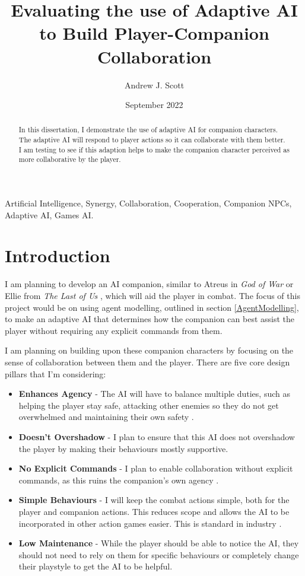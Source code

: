 \documentclass{IEEEtran}
\title{Evaluating the use of Adaptive AI to Build Player-Companion Collaboration}
\author{Andrew J. Scott}
\date{September 2022}
\begin{document}
	\maketitle

\begin{abstract}
In this dissertation, I demonstrate the use of adaptive AI for companion characters. The adaptive AI will respond to player actions so it can collaborate with them better. I am testing to see if this adaption helps to make the companion character perceived as more collaborative by the player.
\end{abstract}

 \begin{IEEEkeywords}
Artificial Intelligence, Synergy, Collaboration, Cooperation, Companion NPCs, Adaptive AI, Games AI.
\end{IEEEkeywords}

\section{Introduction}
\label{Intro}

I am planning to develop an AI companion, similar to Atreus in \textit{God of War} \cite{GDCAtreus} or Ellie from \textit{The Last of Us} \cite{GAIP2EllieAI}, which will aid the player in combat. The focus of this project would be on using agent modelling, outlined in section \ref{AgentModelling}, to make an adaptive AI that determines how the companion can best assist the player without requiring any explicit commands from them.

I am planning on building upon these companion characters by focusing on the sense of collaboration between them and the player. There are five core design pillars that I’m considering:

\label{CoreDesign}
\begin{itemize}
	\item \textbf{Enhances Agency} - The AI will have to balance multiple duties, such as helping the player stay safe, attacking other enemies so they do not get overwhelmed and maintaining their own safety \cite{CoupledEmpowermentMaximisation, tremblay2013adaptive}.
	\item \textbf{Doesn't Overshadow} - I plan to ensure that this AI does not overshadow the player \cite{CoupledEmpowermentMaximisation, DesignDocAIAllies} by making their behaviours mostly supportive.
	\item \textbf{No Explicit Commands} - I plan to enable collaboration without explicit commands, as this ruins the companion's own agency \cite{EGXCharacterDeathGuildWars}.
	\item \textbf{Simple Behaviours} - I will keep the combat actions simple, both for the player and companion actions. This reduces scope and allows the AI to be incorporated in other action games easier. This is standard in industry \cite{GMTGoodAI, GDCLessIsMore, GDCSimplestAITrick}.
	\item \textbf{Low Maintenance} - While the player should be able to notice the AI, they should not need to rely on them for specific behaviours or completely change their playstyle to get the AI to be helpful.
\end{itemize}
 
\end{document}
